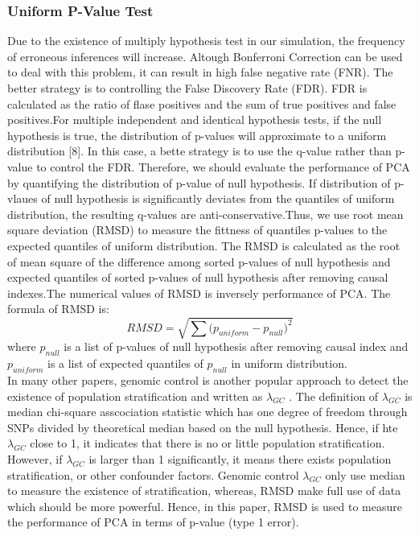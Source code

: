 \documentclass[12pt]{article}
\begin{document}
\subsubsection{Uniform P-Value Test }
Due to the existence of multiply hypothesis test in our simulation, the frequency of erroneous inferences will increase. Altough Bonferroni Correction can be used to deal with this problem, it can result in high false negative rate (FNR). The better strategy is to controlling the False Discovery Rate (FDR). FDR is calculated as the ratio of flase positives and the sum of true positives and false positives.For multiple independent and identical hypothesis tests, if the null hypothesis is true, the distribution of p-values will approximate to a uniform distribution [8]. In this case, a bette strategy is to use the q-value rather than p-value to control the FDR. Therefore, we should evaluate the performance of PCA by quantifying the distribution of p-value of null hypothesis. If distribution of p-vlaues of null hypothesis is significantly deviates from the quantiles of uniform distribution, the resulting q-values are anti-conservative.Thus, we use root mean square deviation (RMSD) to measure the fittness of quantiles p-values to the expected quantiles of uniform distribution. The RMSD is calculated as the root of mean square of the difference among sorted p-values of null hypothesis and expected quantiles of sorted p-values of null hypothesis after removing causal indexes.The numerical values of RMSD is inversely  performance of PCA. The formula of RMSD is:
$$RMSD=\sqrt{\sum{(p_{uniform}-p_{null}})^2}$$
where $p_{null}$ is a list of p-values of null hypothesis after removing causal index and $p_{uniform}$ is a list of expected quantiles of $p_{null}$ in uniform distribution. \\

In many other papers, genomic control is another popular approach to detect the existence of population stratification and written as $\lambda_{GC}$ . The definition of $\lambda_{GC}$ is median chi-square asscociation statistic which has one degree of freedom through SNPs divided by theoretical median based on the null hypothesis. Hence, if hte $\lambda_{GC}$ close to 1, it indicates that there is no or little population stratification. However, if $\lambda_{GC}$ is larger than 1 significantly, it means there exists population stratification, or other confounder factors. Genomic control $\lambda_{GC}$ only use median to measure the existence of stratification, whereas, RMSD make full use of data which should be more powerful. Hence, in this paper, RMSD is used to measure the performance of PCA in terms of p-value (type 1 error).
\end{document}
